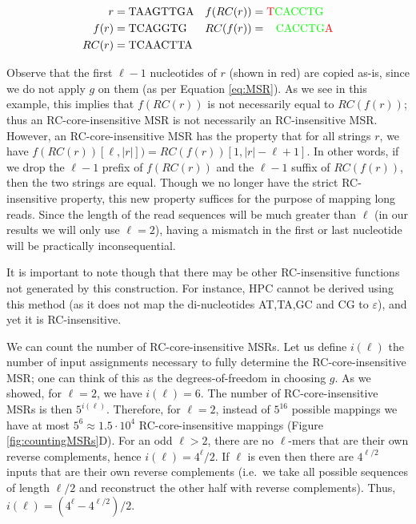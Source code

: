 \documentclass[
  11,
]{scrbook}
\begin{document}
\begin{align*}
    r & = \text{TAAGTTGA}    & f(RC(r)) &=\color{red}{\text{T}}\color{green}{\text{CACCTG}} \\
    f(r) & =\text{TCAGGTG}   & RC(f(r)) &=\;\;\;\color{green}{\text{CACCTG}}\color{red}{\text{A}} \\
    RC(r) & =\text{TCAACTTA} & &
\end{align*}

Observe that the first \(\ell-1\) nucleotides of \(r\) (shown in red) are
copied as-is, since we do not apply \(g\) on them (as per
Equation \eqref{eq:MSR}). As
we see in this example, this implies that \(f(RC(r))\) is not necessarily
equal to \(RC(f(r))\); thus an RC-core-insensitive MSR is not necessarily
an RC-insensitive MSR. However, an RC-core-insensitive MSR has the
property that for all strings \(r\), we have
\(f(RC(r))[\ell, |r|]) = RC(f(r))[1, |r| - \ell + 1]\). In other words, if
we drop the \(\ell - 1\) prefix of \(f(RC(r))\) and the \(\ell - 1\) suffix of
\(RC(f(r))\), then the two strings are equal. Though we no longer have the
strict RC-insensitive property, this new property suffices for the
purpose of mapping long reads. Since the length of the read sequences
will be much greater than \(\ell\) (in our results we will only use
\(\ell=2\)), having a mismatch in the first or last nucleotide will be
practically inconsequential.

It is important to note though that there may be other RC-insensitive
functions not generated by this construction. For instance, HPC cannot
be derived using this method (as it does not map the di-nucleotides
AT,TA,GC and CG to \(\varepsilon\)), and yet it is RC-insensitive.

We can count the number of RC-core-insensitive MSRs. Let us define
\(i(\ell)\) the number of input assignments necessary to fully determine
the RC-core-insensitive MSR; one can think of this as the
degrees-of-freedom in choosing \(g\). As we showed, for \(\ell=2\), we have
\(i(\ell)=6\). The number of RC-core-insensitive MSRs is then
\(5^{i(\ell)}\). Therefore, for \(\ell=2\), instead of \(5^{16}\) possible
mappings we have at most \(5^{6}\approx1.5\cdot10^{4}\)
RC-core-insensitive mappings
(Figure \ref{fig:countingMSRs}D). For an odd \(\ell>2\), there are no
\(\ell\)-mers that are their own reverse complements, hence
\(i(\ell)=4^\ell/2\). If \(\ell\) is even then there are \(4^{\ell/2}\) inputs
that are their own reverse complements (i.e.~we take all possible
sequences of length \(\ell/2\) and reconstruct the other half with reverse
complements). Thus, \(i(\ell)=(4^\ell- 4^{\ell/2})/2\).
\end{document}
